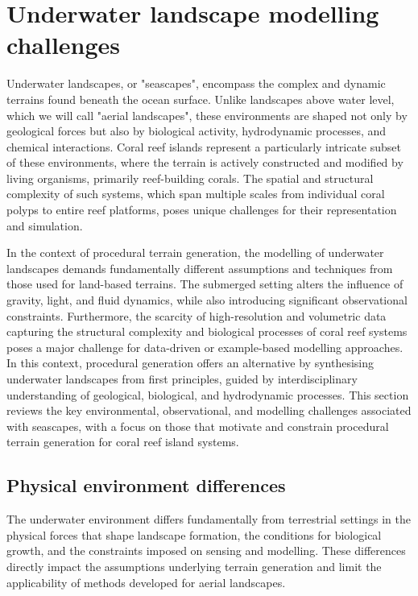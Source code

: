 \section{Underwater landscape modelling challenges}
Underwater landscapes, or "seascapes", encompass the complex and dynamic terrains found beneath the ocean surface. Unlike landscapes above water level, which we will call "aerial landscapes", these environments are shaped not only by geological forces but also by biological activity, hydrodynamic processes, and chemical interactions. Coral reef islands represent a particularly intricate subset of these environments, where the terrain is actively constructed and modified by living organisms, primarily reef-building corals. The spatial and structural complexity of such systems, which span multiple scales from individual coral polyps to entire reef platforms, poses unique challenges for their representation and simulation.

In the context of procedural terrain generation, the modelling of underwater landscapes demands fundamentally different assumptions and techniques from those used for land-based terrains. The submerged setting alters the influence of gravity, light, and fluid dynamics, while also introducing significant observational constraints. Furthermore, the scarcity of high-resolution and volumetric data capturing the structural complexity and biological processes of coral reef systems poses a major challenge for data-driven or example-based modelling approaches. In this context, procedural generation offers an alternative by synthesising underwater landscapes from first principles, guided by interdisciplinary understanding of geological, biological, and hydrodynamic processes. This section reviews the key environmental, observational, and modelling challenges associated with seascapes, with a focus on those that motivate and constrain procedural terrain generation for coral reef island systems.


\subsection{Physical environment differences}
The underwater environment differs fundamentally from terrestrial settings in the physical forces that shape landscape formation, the conditions for biological growth, and the constraints imposed on sensing and modelling. These differences directly impact the assumptions underlying terrain generation and limit the applicability of methods developed for aerial landscapes.

